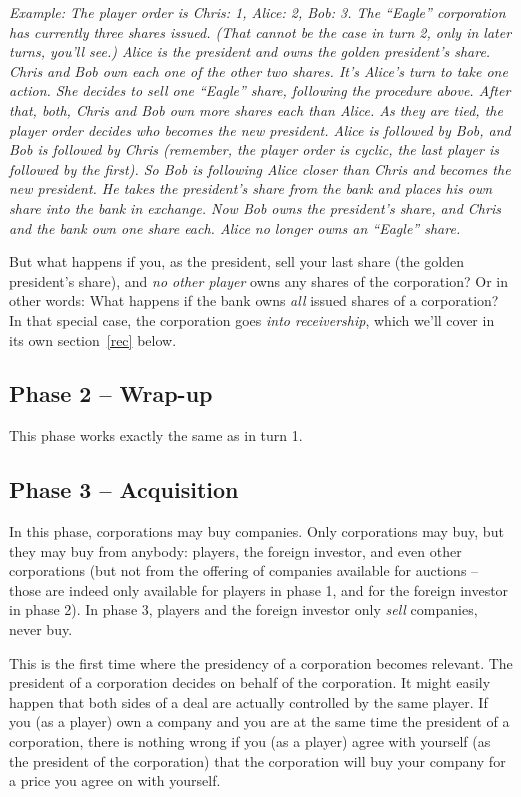\documentclass[10pt,final]{report}
\begin{document}
\begin{multicols}{2}
\emph{Example: The player order is Chris: 1, Alice: 2, Bob: 3. The
  ``Eagle'' corporation has currently three shares issued.  (That
  cannot be the case in turn 2, only in later turns, you'll see.)
  Alice is the president and owns the golden president's share. Chris
  and Bob own each one of the other two shares. It's Alice's turn to
  take one action. She decides to sell one ``Eagle'' share, following
  the procedure above. After that, both, Chris and Bob own more shares
  each than Alice. As they are tied, the player order decides who
  becomes the new president. Alice is followed by Bob, and Bob is
  followed by Chris (remember, the player order is cyclic, the last
  player is followed by the first). So Bob is following Alice closer
  than Chris and becomes the new president. He takes the president's
  share from the bank and places his own share into the bank in
  exchange. Now Bob owns the president's share, and Chris and the bank
  own one share each. Alice no longer owns an ``Eagle'' share.}

But what happens if you, as the president, sell your last share (the
golden president's share), and \emph{no other player} owns any shares
of the corporation? Or in other words: What happens if the bank owns
\emph{all} issued shares of a corporation? In that special case, the
corporation goes \emph{into receivership}, which we'll cover in its
own section~\ref{rec} below.

\subsection{Phase 2 -- Wrap-up}

This phase works exactly the same as in turn 1.

\subsection{Phase 3 -- Acquisition}

In this phase, corporations may buy companies. Only corporations may
buy, but they may buy from anybody: players, the foreign investor, and
even other corporations (but not from the offering of companies
available for auctions -- those are indeed only available for players
in phase 1, and for the foreign investor in phase 2). In phase 3,
players and the foreign investor only \emph{sell} companies, never
buy.

This is the first time where the presidency of a corporation becomes
relevant. The president of a corporation decides on behalf of the
corporation. It might easily happen that both sides of a deal are
actually controlled by the same player. If you (as a player) own a
company and you are at the same time the president of a corporation,
there is nothing wrong if you (as a player) agree with yourself (as
the president of the corporation) that the corporation will buy your
company for a price you agree on with yourself.


\end{multicols}
\end{document}
